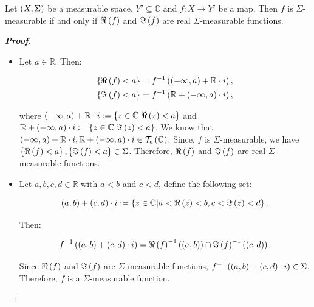 \begin{proposition}
  Let $\left(X,\Sigma\right)$ be a measurable space, $Y'\subseteq\mathbb{C}$ and $f:X\rightarrow Y'$ be a map. Then $f$ is $\Sigma$-measurable if and only if $\Re\left(f\right)$ and $\Im\left(f\right)$ are real $\Sigma$-measurable functions.
  \begin{proof}[\rm\textbf{Proof}]
    \hfill
    \begin{itemize}
      \item[\boxed{\Rightarrow}] Let $a\in\mathbb{R}$. Then:
      
      \begin{equation}
        \begin{split}
          \left\{\Re\left(f\right)<a\right\} & =f^{-1}\left(\left(-\infty,a\right)+\mathbb{R}\cdot i\right),\\
          \left\{\Im\left(f\right)<a\right\} & =f^{-1}\left(\mathbb{R}+\left(-\infty,a\right)\cdot i\right),
        \end{split}
      \end{equation}

      where $\left(-\infty,a\right)+\mathbb{R}\cdot i:=\left\{z\in\mathbb{C}\middle|\Re\left(z\right)<a\right\}$ and $\mathbb{R}+\left(-\infty,a\right)\cdot i:=\left\{z\in\mathbb{C}\middle|\Im\left(z\right)<a\right\}$. We know that $\left(-\infty,a\right)+\mathbb{R}\cdot i,\mathbb{R}+\left(-\infty,a\right)\cdot i\in\mathcal{T}_e\left(\mathbb{C}\right)$. Since, $f$ is $\Sigma$-measurable, we have $\left\{\Re\left(f\right)<a\right\},\left\{\Im\left(f\right)<a\right\}\in\Sigma$. Therefore, $\Re\left(f\right)$ and $\Im\left(f\right)$ are real $\Sigma$-measurable functions.
      \item[\boxed{\Leftarrow}] Let $a,b,c,d\in\mathbb{R}$ with $a<b$ and $c<d$, define the following set:
      
      \begin{equation}
        \left(a,b\right)+\left(c,d\right)\cdot i:=\left\{z\in\mathbb{C}\middle|a<\Re\left(z\right)<b,c<\Im\left(z\right)<d\right\}.
      \end{equation}
      
      Then:

      \begin{equation}
        f^{-1}\left(\left(a,b\right)+\left(c,d\right)\cdot i\right)=\Re\left(f\right)^{-1}\left(\left(a,b\right)\right)\cap\Im\left(f\right)^{-1}\left(\left(c,d\right)\right).
      \end{equation}

      Since $\Re\left(f\right)$ and $\Im\left(f\right)$ are $\Sigma$-measurable functions, $f^{-1}\left(\left(a,b\right)+\left(c,d\right)\cdot i\right)\in\Sigma$. Therefore, $f$ is a $\Sigma$-measurable function.
    \end{itemize}
  \end{proof}
\end{proposition}


